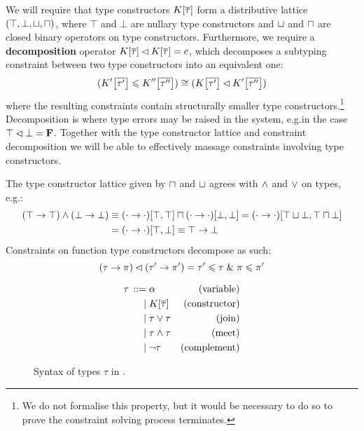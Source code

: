 We will require that type constructors $K[\overline \tau]$ form a distributive lattice $(\top, \bot, \sqcup, \sqcap)$, where $\top$ and $\bot$ are nullary type constructors and $\sqcup$ and $\sqcap$ are closed binary operators on type constructors. Furthermore, we require a \textbf{decomposition} operator $K[\overline \tau] \lhd K[\overline \tau] = c$, which decomposes a subtyping constraint between two type constructors into an equivalent one:
$$ (\constr'\left[\overline {\tau'}\right] \sub \constr''\left[\overline {\tau''}\right]) \cstreq (\constr\left[\overline {\tau'}\right] \cdecomp \constr'\left[\overline {\tau''}\right]) $$
where the resulting constraints contain structurally smaller type constructors.\footnote{We do not formalise this property, but it would be necessary to do so to prove the constraint solving process terminates.} Decomposition is where type errors may be raised in the system, e.g.\@ in the case $\top \lhd \bot = \mathbf F$. Together with the type constructor lattice and constraint decomposition we will be able to effectively massage constraints involving type constructors. 
\begin{example}
    The type constructor lattice given by $\sqcap$ and $\sqcup$ agrees with $\land$ and $\lor$ on types, e.g.:
    \begin{align*}
       (\top \to \top) \land (\bot \to \bot) 
       &\equiv (\cdot \to \cdot)[\top, \top] \sqcap (\cdot \to \cdot)[\bot, \bot] = (\cdot \to \cdot)[\top \sqcup \bot, \top \sqcap \bot] \\
       &= (\cdot \to \cdot)[\top, \bot] \equiv \top \to \bot 
    \end{align*}
    Constraints on function type constructors decompose as such:
    $$ (\tau \to \pi) \lhd (\tau' \to \pi') = \tau' \leqslant \tau \;\&\; \pi \leqslant \pi' $$
\end{example}

\begin{figure}
    \centering
    \begin{align*}
    {\tau} \,::=&\; 
             \alpha & \text{(variable)}
    \\ \mid&\; K[\overline \tau] & \text{(constructor)}
    \\ \mid&\; \tau \lor \tau & \text{(join)}
    \\ \mid&\; \tau \land \tau & \text{(meet)}
    \\ \mid&\; \lnot \tau & \text{(complement)}
    \end{align*}
    \caption{Syntax of types $\tau$ in \inference{}.}
    \label{fig:signature-types}
\end{figure}

